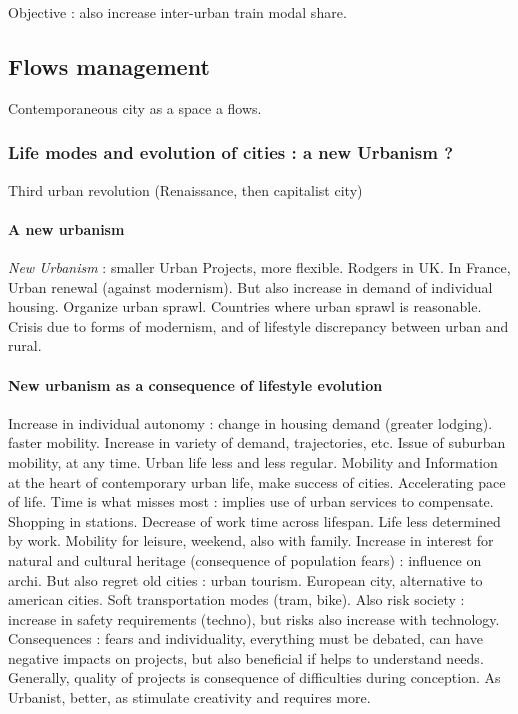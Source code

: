 Objective : also increase inter-urban train modal share.





\subsection{Flows management}

Contemporaneous city as a space a flows.

\subsubsection{Life modes and evolution of cities : a new Urbanism ?}

Third urban revolution (Renaissance, then capitalist city)

\paragraph{A new urbanism}

\textit{New Urbanism} : smaller Urban Projects, more flexible. Rodgers in UK. In France, Urban renewal (against modernism). But also increase in demand of individual housing. Organize urban sprawl. Countries where urban sprawl is reasonable. Crisis due to forms of modernism, and of lifestyle discrepancy between urban and rural.

\paragraph{New urbanism as a consequence of lifestyle evolution}

Increase in individual autonomy : change in housing demand (greater lodging). faster mobility. Increase in variety of demand, trajectories, etc. Issue of suburban mobility, at any time. Urban life less and less regular. Mobility and Information at the heart of contemporary urban life, make success of cities. Accelerating pace of life. Time is what misses most : implies use of urban services to compensate. Shopping in stations. Decrease of work time across lifespan. Life less determined by work. Mobility for leisure, weekend, also with family. Increase in interest for natural and cultural heritage (consequence of population fears) : influence on archi. But also regret old cities : urban tourism. European city, alternative to american cities. Soft transportation modes (tram, bike). Also risk society : increase in safety requirements (techno), but risks also increase with technology. Consequences : fears and individuality, everything must be debated, can have negative impacts on projects, but also beneficial if helps to understand needs. Generally, quality of projects is consequence of difficulties during conception. As Urbanist, better, as stimulate creativity and requires more.
















